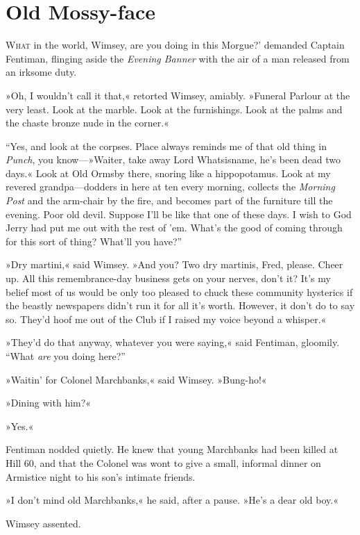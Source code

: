 \chapter{Old Mossy-face}
\lettrine[lines=4,ante=‘]{W}{hat} in the world, Wimsey, are you doing in this \newline Morgue?' demanded Captain Fentiman, flinging aside the \textit{Evening Banner} with the air of a man released from an irksome duty.

»Oh, I wouldn't call it that,« retorted Wimsey, amiably. »Funeral Parlour at the very least. Look at the marble. Look at the furnishings. Look at the palms and the chaste bronze nude in the corner.«

\enquote{Yes, and look at the corpses. Place always reminds me of that old thing in \textit{Punch}, you know---»Waiter, take away Lord Whatsisname, he's been dead two days.« Look at Old Ormsby there, snoring like a hippopotamus. Look at my revered grandpa\allowbreak---\allowbreak dodders in here at ten every morning, collects the \textit{Morning Post} and the arm-chair by the fire, and becomes part of the furniture till the evening. Poor old devil. Suppose I'll be like that one of these days. I wish to God Jerry had put me out with the rest of 'em. What's the good of coming through for this sort of thing? What'll you have?}

»Dry martini,« said Wimsey. »And you? Two dry martinis, Fred, please. Cheer up. All this remembrance-day business gets on your nerves, don't it? It's my belief most of us would be only too pleased to chuck these community hysterics if the beastly newspapers didn't run it for all it's worth. However, it don't do to say so. They'd hoof me out of the Club if I raised my voice beyond a whisper.«

»They'd do that anyway, whatever you were saying,« said Fentiman, gloomily. \enquote{What \textit{are} you doing here?}

»Waitin' for Colonel Marchbanks,« said Wimsey. »Bung-ho!«

»Dining with him?«

»Yes.«

Fentiman nodded quietly. He knew that young Marchbanks had been killed at Hill 60, and that the Colonel was wont to give a small, informal dinner on Armistice night to his son's intimate friends.

»I don't mind old Marchbanks,« he said, after a pause. »He's a dear old boy.«

Wimsey assented.

